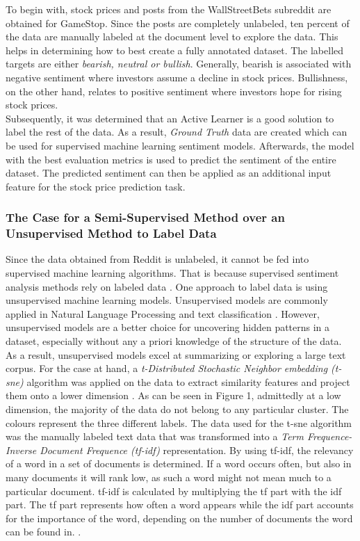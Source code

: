 \documentclass[11pt, a4paper]{article}
\begin{document}
\noindent To begin with, stock prices and posts from the WallStreetBets subreddit are obtained for GameStop. Since the posts are completely
unlabeled, ten percent of the data are manually labeled at the document level to explore the data. This helps in determining how to best create a fully annotated dataset.
The labelled targets are either \emph{bearish, neutral or bullish}. Generally, bearish is associated with negative 
sentiment where investors assume a decline in stock prices. Bullishness, on the other hand, relates to positive sentiment where investors hope for rising stock prices. \\
Subsequently, it was determined that an Active Learner is a good solution to label the rest of the data. As a result, \emph{Ground Truth} data are created which can be used
for supervised machine learning sentiment models. Afterwards, the model with the best evaluation metrics is used to predict the sentiment of the entire
dataset. The predicted sentiment can then be applied as an additional input feature for the stock price prediction task.

\subsubsection{The Case for a Semi-Supervised Method over an Unsupervised Method to Label Data}
Since the data obtained from Reddit is unlabeled, it cannot be fed into supervised machine learning algorithms. 
That is because supervised sentiment analysis methods rely on labeled data \citep{sazzed2021ssentia}. One approach to label 
data is using unsupervised machine learning models. Unsupervised models are commonly applied in Natural Language Processing 
and text classification \citep{jung2019automatedclassification}. However, unsupervised models are a better choice for uncovering hidden 
patterns in a dataset, especially without any a priori knowledge of the structure of the data. As a result, unsupervised models 
excel at summarizing or exploring a large text corpus. 
For the case at hand, a \emph{t-Distributed Stochastic Neighbor embedding (t-sne)} algorithm was applied on the data to extract similarity 
features and project them onto a lower dimension \citep{binu2020dimreductiontsne}. As can be seen in Figure 1, admittedly 
at a low dimension, the majority of the data do not belong to any particular cluster. The colours represent the three different 
labels. The data used for the t-sne algorithm was the
manually labeled text data that was transformed into a \emph{Term Frequence-Inverse Document Frequence (tf-idf)} representation.
By using tf-idf, the relevancy of a word in a set of documents is determined. If a word occurs often, but also in many documents
it will rank low, as such a word might not mean much to a particular document. tf-idf is calculated by multiplying the tf part with the
idf part. The tf part represents how often a word appears while the idf part accounts for the importance of the word, depending on
the number of documents the word can be found in. \citep{Guia2019ComparisonON, jason2021tfidf}.
\end{document}
